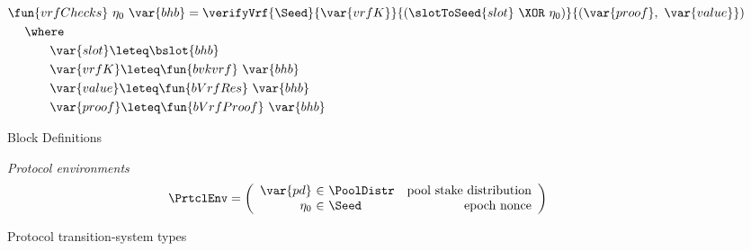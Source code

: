 \begin{figure*}[htb]
\begin{align*}
      & \fun{vrfChecks}~\eta_0~\var{bhb} =
          \verifyVrf{\Seed}{\var{vrfK}}{(\slotToSeed{slot}~\XOR~\eta_0)}{(\var{proof},~\var{value}}) \\
      & ~~~~\where \\
      & ~~~~~~~~~~\var{slot} \leteq \bslot{bhb} \\
      & ~~~~~~~~~~\var{vrfK} \leteq \fun{bvkvrf}~\var{bhb} \\
      & ~~~~~~~~~~\var{value} \leteq \fun{bVrfRes}~\var{bhb} \\
      & ~~~~~~~~~~\var{proof} \leteq \fun{bVrfProof}~\var{bhb} \\
  \end{align*}
  \caption{Block Definitions}
  \label{fig:defs:blocks}
\end{figure*}


\begin{figure}
  \emph{Protocol environments}
  \begin{equation*}
    \PrtclEnv =
    \left(
      \begin{array}{r@{~\in~}lr}
        \var{pd} & \PoolDistr & \text{pool stake distribution} \\
        \eta_0 & \Seed & \text{epoch nonce} \\
      \end{array}
    \right)
  \end{equation*}
  \caption{Protocol transition-system types}
  \label{fig:ts-types:prtcl}
\end{figure}

